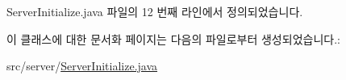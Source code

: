 Server\-Initialize.\-java 파일의 12 번째 라인에서 정의되었습니다.



이 클래스에 대한 문서화 페이지는 다음의 파일로부터 생성되었습니다.\-:\begin{DoxyCompactItemize}
\item 
src/server/\hyperlink{_server_initialize_8java}{Server\-Initialize.\-java}\end{DoxyCompactItemize}
